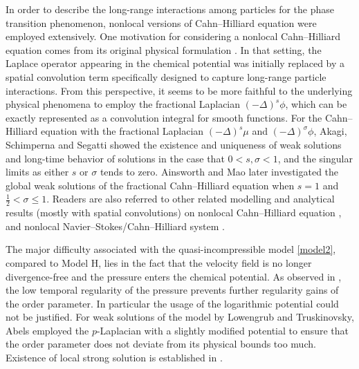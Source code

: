 \documentclass[reqno,a4paper,11pt]{amsart}
\theoremstyle{plain}
\numberwithin{equation}{section}
\begin{document}
	
	In order to describe the long-range interactions among particles for the phase transition phenomenon, nonlocal versions of Cahn--Hilliard equation were employed extensively. One motivation for considering a nonlocal Cahn--Hilliard equation comes from its original physical formulation \cite{CH1958}. In that setting, the Laplace operator appearing in the chemical potential was initially replaced by a spatial convolution term specifically designed to capture long-range particle interactions.
	From this perspective, it seems to be more faithful to the underlying physical phenomena to employ the fractional Laplacian $(-\Delta)^s \phi$, which can be exactly represented as a convolution integral for smooth functions.
	For the Cahn--Hilliard equation with the fractional Laplacian $(-\Delta)^s \mu$ and  $(-\Delta)^{\sigma}\phi$, Akagi, Schimperna and Segatti \cite{ASS}
	showed the existence and uniqueness of weak solutions and long-time behavior of solutions in the case that  $0<s,\sigma<1$, and the singular limits as either $s$ or $\sigma$ tends to zero. Ainsworth and Mao \cite{AM} later investigated the global weak solutions of the fractional Cahn--Hilliard equation when $s=1$ and $\frac{1}{2}<\sigma\leq1$.
	Readers are also referred to other related modelling and analytical results (mostly with spatial convolutions) on nonlocal Cahn--Hilliard equation \cite{ABG,BH,EPPS2024,GGG,Giorgini2024,MR,Poiatti2025}, and nonlocal Navier--Stokes/Cahn--Hilliard system \cite{FS1,FS,FG1,FGG,FGK,HKP2024}.
	
	The major difficulty associated with the quasi-incompressible model \eqref{model2}, compared to Model H, lies in the fact that the velocity field is no longer divergence-free and the pressure enters the chemical potential. As observed in \cite{AH}, the low temporal regularity of the pressure prevents further regularity gains of the order parameter. In particular the usage of the logarithmic potential could not be justified. For weak solutions of the model by Lowengrub and Truskinovsky, Abels \cite{AH} employed the $p$-Laplacian with a slightly modified potential to ensure that the order parameter does not deviate from its physical bounds too much. Existence of local strong solution is established in \cite{AH1}. 
	
\end{document}
